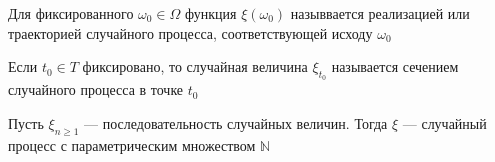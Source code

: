 \begin{definition}
  Для фиксированного $\omega_0 \in \Omega$ функция $\xi\left( \omega_0 \right)$
  назыввается реализацией или траекторией случайного процесса, соответствующей
  исходу $\omega_0$
\end{definition}

\begin{definition}
  Если $t_0 \in T$ фиксировано, то случайная величина $\xi_{t_0}$ называется
  сечением случайного процесса в точке $t_0$
\end{definition}

\begin{example}
  Пусть $\xi_{n \ge 1}$ --- последовательность случайных величин.
  Тогда $\xi$ --- случайный процесс с параметрическим множеством $\mathbb{N}$
\end{example}

